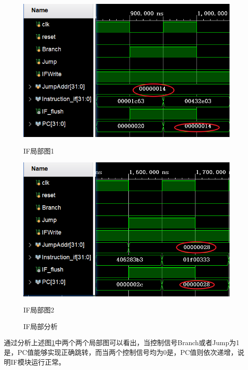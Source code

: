 \documentclass{../source/zjureport}
\begin{document}
            \begin{figure}[H]
                \centering
                \begin{minipage}[t]{0.48\textwidth}
                    \centering
                    \includegraphics[width = \textwidth]{figure/IF局部1.png}
                    \caption*{IF局部图1}
                \end{minipage}
                \begin{minipage}[t]{0.48\textwidth}
                    \centering
                    \includegraphics[width=\textwidth]{figure/IF局部2.png}
                    \caption*{IF局部图2}
                \end{minipage}
                \caption{IF局部分析}
                \label{IF局部图}
            \end{figure}

            通过分析上述图\ref{IF局部图}中两个两个局部图可以看出，当控制信号Branch或者Jump为1是，PC值能够实现正确跳转，而当两个控制信号均为0是，PC值则依次递增，说明IF模块运行正常。
\end{document}
